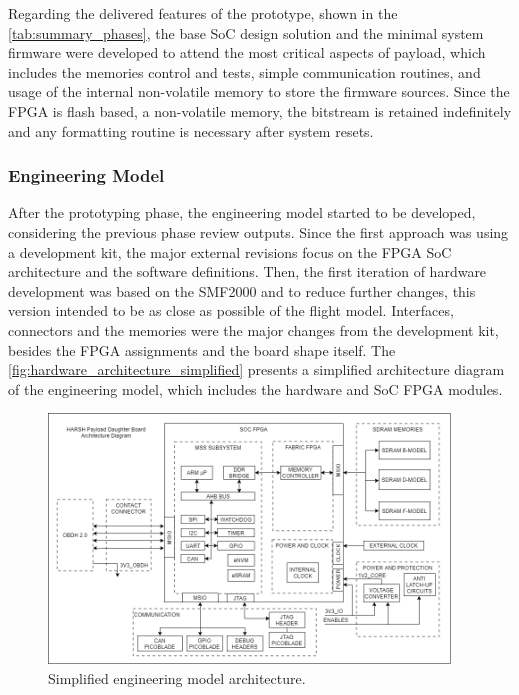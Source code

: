 Regarding the delivered features of the prototype, shown in the \autoref{tab:summary_phases}, the base SoC design solution and the minimal system firmware were developed to attend the most critical aspects of payload, which includes the memories control and tests, simple communication routines, and usage of the internal non-volatile memory to store the firmware sources. Since the FPGA is flash based, a non-volatile memory, the bitstream is retained indefinitely and any formatting routine is necessary after system resets. 


\subsubsection{Engineering Model}

After the prototyping phase, the engineering model started to be developed, considering the previous phase review outputs. Since the first approach was using a development kit, the major external revisions focus on the FPGA SoC architecture and the software definitions. Then, the first iteration of hardware development was based on the SMF2000 and to reduce further changes, this version intended to be as close as possible of the flight model. Interfaces, connectors and the memories were the major changes from the development kit, besides the FPGA assignments and the board shape itself. The \autoref{fig:hardware_architecture_simplified} presents a simplified architecture diagram of the engineering model, which includes the hardware and SoC FPGA modules.

\begin{figure}[!ht]
    \begin{center}
        \includegraphics[width=0.95\textwidth]{figures/hardware_architecture_simplified.png}
        \caption{Simplified engineering model architecture.}
        \label{fig:hardware_architecture_simplified}
    \end{center}
\end{figure}

